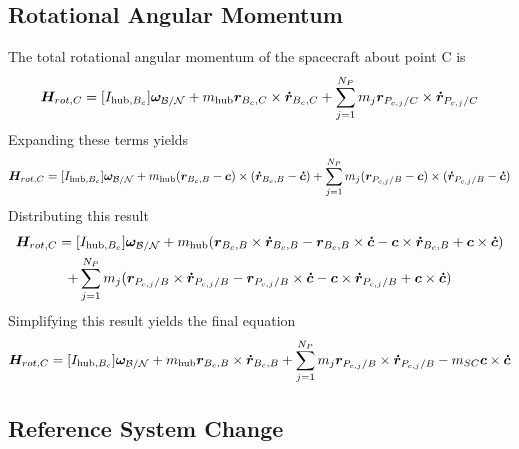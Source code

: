 \subsection{Rotational Angular Momentum}
The total rotational angular momentum of the spacecraft about point C is
\begin{equation}
	\bm{H}_{rot,C}=[I_{\text{hub},B_c}] \bm\omega_{\cal B/N}+m_{\text{hub}}\bm{r}_{B_c,C}\times\bm{\dot{r}}_{B_c,C}+\sum\limits_{j=1}^{N_P}  m_j \bm{r}_{P_{c,j}/C}\times\bm{\dot{r}}_{P_{c,j}/C}
	\label{eq:RAM1}
\end{equation}
Expanding these terms yields
\begin{equation}
	\bm{H}_{rot,C}=[I_{\text{hub},B_c}] \bm\omega_{\cal B/N}+m_{\text{hub}}(\bm{r}_{B_c,B}-\bm{c})\times(\bm{\dot{r}}_{B_c,B}-\bm{\dot{c}})+\sum\limits_{j=1}^{N_P}  m_j (\bm{r}_{P_{c,j}/B}-\bm{c})\times(\bm{\dot{r}}_{P_{c,j}/B}-\bm{\dot{c}})
	\label{eq:RAM2}
\end{equation}
Distributing this result
\begin{multline}
	\bm{H}_{rot,C}=[I_{\text{hub},B_c}] \bm\omega_{\cal B/N}+m_{\text{hub}}(\bm{r}_{B_c,B}\times\bm{\dot{r}}_{B_c,B}-\bm{r}_{B_c,B}\times\bm{\dot{c}}-\bm{c}\times\bm{\dot{r}}_{B_c,B}+\bm{c}\times\bm{\dot{c}})\\+\sum\limits_{j=1}^{N_P} m_j (\bm{r}_{P_{c,j}/B}\times\bm{\dot{r}}_{P_{c,j}/B}-\bm{r}_{P_{c,j}/B}\times\bm{\dot{c}}-\bm{c}\times\bm{\dot{r}}_{P_{c,j}/B}+\bm{c}\times\bm{\dot{c}})
	\label{eq:RAM3}
\end{multline}
Simplifying this result yields the final equation
\begin{equation}
	\bm{H}_{rot,C}=[I_{\text{hub},B_c}] \bm\omega_{\cal B/N}+m_{\text{hub}}\bm{r}_{B_c,B}\times\bm{\dot{r}}_{B_c,B}+\sum\limits_{j=1}^{N_P} m_j \bm{r}_{P_{c,j}/B}\times\bm{\dot{r}}_{P_{c,j}/B}-m_{SC}\bm{c}\times\bm{\dot{c}}
	\label{eq:RAM4}
\end{equation}
\subsection{Reference System Change}

